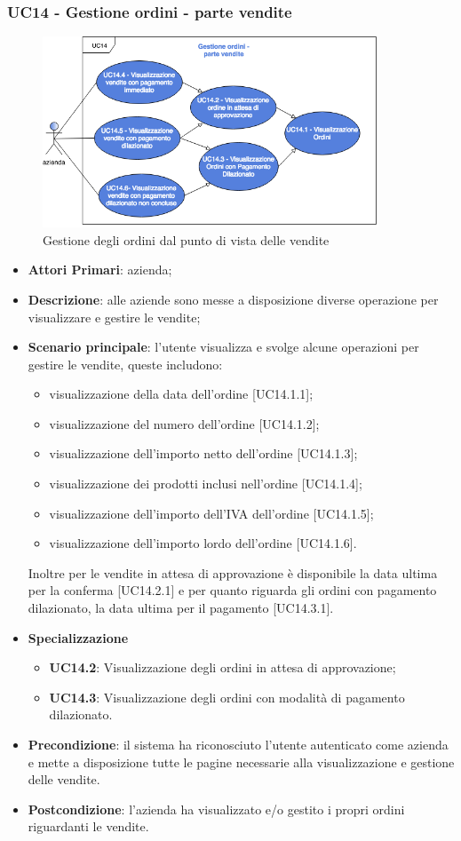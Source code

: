 \subsubsection{UC14 - Gestione ordini - parte vendite}
\begin{figure}[h]
	\includegraphics[width=10cm]{res/images/UC14ParteVendite.png}
	\centering
	\caption{Gestione degli ordini dal punto di vista delle vendite}
\end{figure}
\begin{itemize}
	\item \textbf{Attori Primari}: azienda;
	\item \textbf{Descrizione}: alle aziende sono messe a disposizione diverse operazione per visualizzare e gestire le vendite;
	\item \textbf{Scenario principale}: l'utente visualizza e svolge alcune operazioni per gestire le vendite, queste includono:
	\begin{itemize}
		\item visualizzazione della data dell'ordine [UC14.1.1];
		\item visualizzazione del numero dell'ordine [UC14.1.2];
		\item visualizzazione dell'importo netto dell'ordine [UC14.1.3];
		\item visualizzazione dei prodotti inclusi nell'ordine [UC14.1.4];
		\item visualizzazione dell'importo dell'IVA dell'ordine [UC14.1.5];
		\item visualizzazione dell'importo lordo dell'ordine [UC14.1.6].
	\end{itemize}
Inoltre per le vendite in attesa di approvazione è disponibile la data ultima per la conferma [UC14.2.1] e per quanto riguarda gli ordini con pagamento dilazionato,  la data ultima per il pagamento [UC14.3.1].
	\item \textbf{Specializzazione}
	\begin{itemize}
		\item \textbf{UC14.2}: Visualizzazione degli ordini in attesa di approvazione;
		\item \textbf{UC14.3}: Visualizzazione degli ordini con modalità di pagamento dilazionato.
	\end{itemize}
	\item \textbf{Precondizione}: il sistema ha riconosciuto l'utente autenticato come azienda e mette a disposizione tutte le pagine necessarie alla visualizzazione e gestione delle vendite.
	\item \textbf{Postcondizione}: l'azienda ha visualizzato e/o gestito i propri ordini riguardanti le vendite.
\end{itemize} 
